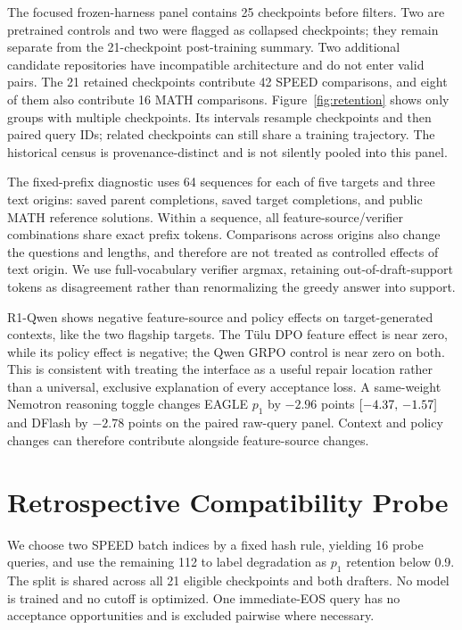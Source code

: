 The focused frozen-harness panel contains 25 checkpoints before filters. Two are pretrained controls and two were flagged as collapsed checkpoints; they remain separate from the 21-checkpoint post-training summary. Two additional candidate repositories have incompatible architecture and do not enter valid pairs. The 21 retained checkpoints contribute 42 SPEED comparisons, and eight of them also contribute 16 MATH comparisons. Figure~\ref{fig:retention} shows only groups with multiple checkpoints. Its intervals resample checkpoints and then paired query IDs; related checkpoints can still share a training trajectory. The historical census is provenance-distinct and is not silently pooled into this panel.

The fixed-prefix diagnostic uses 64 sequences for each of five targets and three text origins: saved parent completions, saved target completions, and public MATH reference solutions. Within a sequence, all feature-source/verifier combinations share exact prefix tokens. Comparisons across origins also change the questions and lengths, and therefore are not treated as controlled effects of text origin. We use full-vocabulary verifier argmax, retaining out-of-draft-support tokens as disagreement rather than renormalizing the greedy answer into support.

R1-Qwen shows negative feature-source and policy effects on target-generated contexts, like the two flagship targets. The T\"ulu DPO feature effect is near zero, while its policy effect is negative; the Qwen GRPO control is near zero on both. This is consistent with treating the interface as a useful repair location rather than a universal, exclusive explanation of every acceptance loss. A same-weight Nemotron reasoning toggle changes EAGLE $p_1$ by $-2.96$ points $[-4.37,\,-1.57]$ and DFlash by $-2.78$ points on the paired raw-query panel. Context and policy changes can therefore contribute alongside feature-source changes.

\section{Retrospective Compatibility Probe}
\label{app:probe}
We choose two SPEED batch indices by a fixed hash rule, yielding 16 probe queries, and use the remaining 112 to label degradation as $p_1$ retention below 0.9. The split is shared across all 21 eligible checkpoints and both drafters. No model is trained and no cutoff is optimized. One immediate-EOS query has no acceptance opportunities and is excluded pairwise where necessary.

